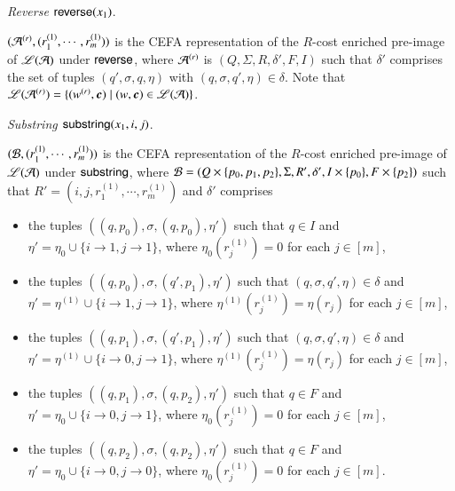 \smallskip 

\noindent \emph{Reverse $\mathsf{reverse}(x_1)$}. 

$(\mathcal{A}^{(r)}, (r^{(1)}_1, \cdots, r^{(1)}_m))$ is the CEFA representation of the $R$-cost enriched pre-image of $\mathscr{L}(\mathcal{A})$ under $\mathsf{reverse}$, where $\mathcal{A}^{(r)}$ is $(Q, \Sigma, R, \delta', F, I)$ such that $\delta'$ comprises the set of tuples $(q', \sigma, q, \eta)$ with  $(q, \sigma, q', \eta) \in \delta$. Note that $\Lang(\NFA^{(r)}) = \{(w^{(r)}, \vec{c}) \mid (w, \vec{c}) \in \Lang(\NFA)\}$.


\smallskip

\noindent \emph{Substring $\mathsf{substring}(x_1, i, j)$}.


$(\mathcal{B}, (r^{(1)}_1, \cdots, r^{(1)}_m))$ is the CEFA representation of the $R$-cost enriched pre-image of $\mathscr{L}(\mathcal{A})$ under $\mathsf{substring}$, where $\mathcal{B} = (Q \times \{p_0, p_1, p_2\}, \Sigma, R', \delta', I \times \{p_0\}, F \times \{p_2\})$ such that $R' = (i, j, r^{(1)}_1,\cdots, r^{(1)}_m)$ and $\delta'$ comprises 
\begin{itemize}
\item the tuples $((q, p_0), \sigma, (q, p_0), \eta')$ such that $q \in I$ and $\eta' = \eta_0 \cup \{i \rightarrow 1, j \rightarrow 1\}$, where $\eta_0(r^{(1)}_j)=0$ for each $j \in [m]$,
%
\item the tuples $((q, p_0), \sigma, (q', p_1), \eta')$ such that $(q, \sigma, q', \eta) \in \delta$ and $\eta' = \eta^{(1)} \cup \{i \rightarrow 1, j  \rightarrow 1\}$, where $\eta^{(1)}(r^{(1)}_j)=\eta(r_j)$ for each $j \in [m]$,
%
\item the tuples $((q, p_1), \sigma, (q', p_1), \eta')$ such that $(q, \sigma, q', \eta) \in \delta$ and $\eta' = \eta^{(1)} \cup \{i \rightarrow 0, j  \rightarrow 1\}$, where $\eta^{(1)}(r^{(1)}_j)=\eta(r_j)$ for each $j \in [m]$,
%
\item the tuples $((q, p_1), \sigma, (q, p_2), \eta')$ such that $q \in F$ and $\eta' = \eta_0 \cup \{i \rightarrow 0, j  \rightarrow 1\}$, where $\eta_0(r^{(1)}_j)=0$ for each $j \in [m]$,
%
\item the tuples $((q, p_2), \sigma, (q, p_2), \eta')$ such that $q \in F$ and $\eta' = \eta_0 \cup \{i \rightarrow 0, j  \rightarrow 0\}$, where $\eta_0(r^{(1)}_j)=0$ for each $j \in [m]$.
%
\end{itemize}
%

